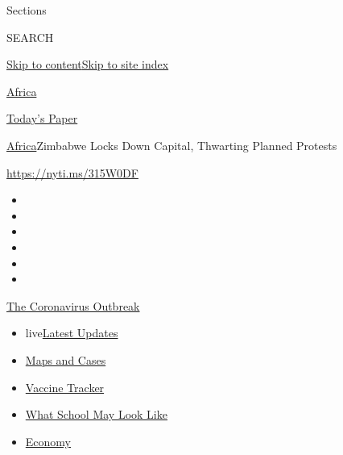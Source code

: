 Sections

SEARCH

\protect\hyperlink{site-content}{Skip to
content}\protect\hyperlink{site-index}{Skip to site index}

\href{https://www.nytimes.com/section/world/africa}{Africa}

\href{https://myaccount.nytimes.com/auth/login?response_type=cookie\&client_id=vi}{}

\href{https://www.nytimes.com/section/todayspaper}{Today's Paper}

\href{/section/world/africa}{Africa}\textbar{}Zimbabwe Locks Down
Capital, Thwarting Planned Protests

\url{https://nyti.ms/315W0DF}

\begin{itemize}
\item
\item
\item
\item
\item
\item
\end{itemize}

\href{https://www.nytimes.com/news-event/coronavirus?action=click\&pgtype=Article\&state=default\&region=TOP_BANNER\&context=storylines_menu}{The
Coronavirus Outbreak}

\begin{itemize}
\tightlist
\item
  live\href{https://www.nytimes.com/2020/08/01/world/coronavirus-covid-19.html?action=click\&pgtype=Article\&state=default\&region=TOP_BANNER\&context=storylines_menu}{Latest
  Updates}
\item
  \href{https://www.nytimes.com/interactive/2020/us/coronavirus-us-cases.html?action=click\&pgtype=Article\&state=default\&region=TOP_BANNER\&context=storylines_menu}{Maps
  and Cases}
\item
  \href{https://www.nytimes.com/interactive/2020/science/coronavirus-vaccine-tracker.html?action=click\&pgtype=Article\&state=default\&region=TOP_BANNER\&context=storylines_menu}{Vaccine
  Tracker}
\item
  \href{https://www.nytimes.com/interactive/2020/07/29/us/schools-reopening-coronavirus.html?action=click\&pgtype=Article\&state=default\&region=TOP_BANNER\&context=storylines_menu}{What
  School May Look Like}
\item
  \href{https://www.nytimes.com/live/2020/07/31/business/stock-market-today-coronavirus?action=click\&pgtype=Article\&state=default\&region=TOP_BANNER\&context=storylines_menu}{Economy}
\end{itemize}

